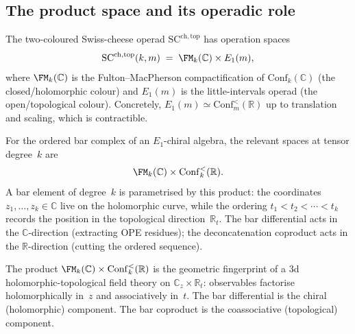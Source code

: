 \subsection{The product space and its operadic role}
\label{subsec:product-space}

\begin{construction}
\label{constr:sc-operation-space}
The two-coloured Swiss-cheese operad
$\mathrm{SC}^{\mathrm{ch,top}}$ has operation spaces
\[
\mathrm{SC}^{\mathrm{ch,top}}(k,m)
\;=\;
\FM_k(\mathbb C)\times E_1(m),
\]
where $\FM_k(\mathbb C)$ is the Fulton--MacPherson
compactification of $\mathrm{Conf}_k(\mathbb C)$
(the closed/holomorphic colour) and $E_1(m)$ is
the little-intervals operad (the open/topological colour).
Concretely, $E_1(m)\simeq \mathrm{Conf}_m^{<}(\mathbb R)$
up to translation and scaling, which is contractible.

For the ordered bar complex of an $E_1$-chiral algebra,
the relevant spaces at tensor degree~$k$ are
\[
\FM_k(\mathbb C)\times \mathrm{Conf}_k^{<}(\mathbb R).
\]
A bar element of degree~$k$ is parametrised by this product:
the coordinates $z_1,\dots,z_k\in\mathbb C$ live on the
holomorphic curve, while the ordering
$t_1<t_2<\cdots<t_k$ records the position in the
topological direction~$\mathbb R_t$. The bar differential
acts in the $\mathbb C$-direction (extracting OPE residues);
the deconcatenation coproduct acts in the $\mathbb R$-direction
(cutting the ordered sequence).
\end{construction}

\begin{remark}
\label{rem:two-colours-geom}
The product $\FM_k(\mathbb C)\times\mathrm{Conf}_k^{<}(\mathbb R)$
is the geometric fingerprint of a 3d holomorphic-topological
field theory on $\mathbb C_z\times\mathbb R_t$:
observables factorise holomorphically in~$z$ and
associatively in~$t$. The bar differential is the
chiral (holomorphic) component. The bar coproduct is the
coassociative (topological) component.
\end{remark}

